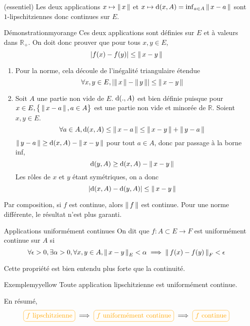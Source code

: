     \begin{coro}{(essentiel)}{}
        Les deux applications $x \mapsto \left\lVert\,x\,\right\rVert$ et $x \mapsto \operatorname{d}(x,A) = \inf_{a \in A} \left\lVert\,x-a\,\right\rVert$ sont $1$-lipschitziennes donc continues sur $E$.
    \end{coro}

    \begin{demo}{Démonstration}{myorange}
        Ces deux applications sont définies sur $E$ et à valeurs dans $\mathbb{R}_+$. On doit donc prouver que pour tous $x,y \in E$, 
        \[ \left\lvert f(x)-f(y)\right\rvert \leq \left\lVert\,x-y\,\right\rVert \] 
        \begin{enumerate}
            \item Pour la norme, cela découle de l’inégalité triangulaire étendue 
        \[ \forall x,y \in E, \left\lvert \left\lVert\,x\,\right\rVert - \left\lVert\,y\,\right\rVert\right\rvert \leq \left\lVert\,x-y\,\right\rVert \]
            \item Soit $A$ une partie non vide de $E$. $\operatorname{d}(.,A)$ est bien définie puisque pour $x \in E, \big\{ \left\lVert\,x-a\,\right\rVert, a \in A \big\}$ est une partie non vide et minorée de $\mathbb{R}$. Soient $x,y \in E$.
            \[ \forall a \in A, \operatorname{d}(x,A) \leq \left\lVert\,x-a\,\right\rVert \leq \left\lVert\,x-y\,\right\rVert + \left\lVert\,y-a\,\right\rVert \] 
            $\left\lVert\,y-a\,\right\rVert \geq \operatorname{d}(x,A) - \left\lVert\,x-y\,\right\rVert$ pour tout $a \in A$, donc par passage à la borne inf, 
            \[ \operatorname{d}(y,A) \geq \operatorname{d}(x,A) - \left\lVert\,x-y\,\right\rVert \] 
            Les rôles de $x$ et $y$ étant symétriques, on a donc 
            \[ \left\lvert \operatorname{d}(x,A) - \operatorname{d}(y,A)\right\rvert \leq \left\lVert\,x-y\,\right\rVert \] 
        \end{enumerate}

        Par composition, si $f$ est continue, alors $\left\lVert\,f\,\right\rVert$ est continue. Pour une norme différente, le résultat n’est plus garanti.
    \end{demo}

    \begin{defi}{Applications uniformément continues}{}
        On dit que $f : A \subset E \rightarrow F$ est uniformément continue sur $A$ si 
        \[ \forall \epsilon > 0, \exists \alpha > 0, \forall x,y \in A, \left\lVert\,x-y\,\right\rVert_E < \alpha \implies \left\lVert\,f(x)-f(y)\,\right\rVert_F < \epsilon \]
    \end{defi}

    Cette propriété est bien entendu plus forte que la continuité.

    \begin{omed}{Exemple}{myyellow}
        Toute application lipschitzienne est uniformément continue.
    \end{omed}

    En résumé, 
    \[ \lilbox{myyellow}{$f$ lipschitzienne} \implies \lilbox{myyellow}{$f$ uniformément continue} \implies \lilbox{myyellow}{$f$ continue} \]

